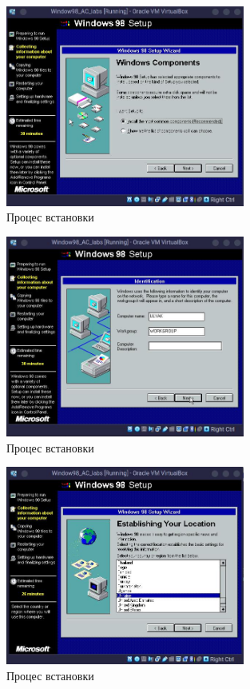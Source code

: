 \begin{figure}[h]
    \centering
    \includegraphics[width=0.7\textwidth]{reports/AC/lab1/assets/9.jpeg}
    \caption{Процес встановки}
\end{figure}

\begin{figure}[h]
    \centering
    \includegraphics[width=0.7\textwidth]{reports/AC/lab1/assets/10.jpeg}
    \caption{Процес встановки}
\end{figure}

\begin{figure}[h]
    \centering
    \includegraphics[width=0.7\textwidth]{reports/AC/lab1/assets/11.jpeg}
    \caption{Процес встановки}
\end{figure}

